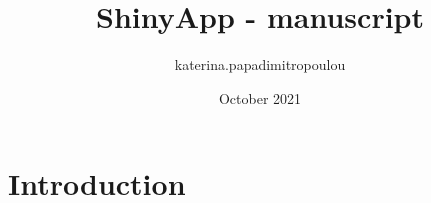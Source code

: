 \documentclass{article}
\title{ShinyApp - manuscript}
\author{katerina.papadimitropoulou }
\date{October 2021}
\begin{document}
\maketitle

\section{Introduction}
\end{document}
